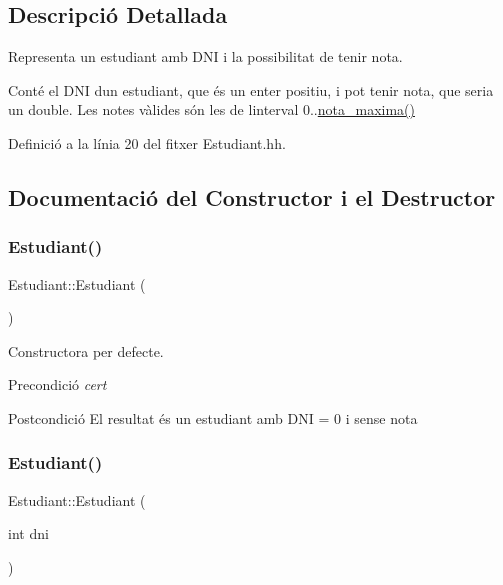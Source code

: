 \subsection{Descripció Detallada}
Representa un estudiant amb D\+NI i la possibilitat de tenir nota. 

Conté el D\+NI d\textquotesingle{}un estudiant, que és un enter positiu, i pot tenir nota, que seria un double. Les notes vàlides són les de l\textquotesingle{}interval 0..\hyperlink{class_estudiant_a5df5eed414c87a2a1c2efa4194633afd}{nota\+\_\+maxima()} 

Definició a la línia 20 del fitxer Estudiant.\+hh.



\subsection{Documentació del Constructor i el Destructor}
\mbox{\label{class_estudiant_a88f7f46dd946fef9f7a71fdc608afd16}} 
\subsubsection{\texorpdfstring{Estudiant()}{Estudiant()}\hspace{0.1cm}{\footnotesize\ttfamily [1/2]}}
{\footnotesize\ttfamily Estudiant\+::\+Estudiant (\begin{DoxyParamCaption}{ }\end{DoxyParamCaption})}



Constructora per defecte. 

\begin{DoxyPrecond}{Precondició}
{\itshape cert} 
\end{DoxyPrecond}
\begin{DoxyPostcond}{Postcondició}
El resultat és un estudiant amb D\+NI = 0 i sense nota 
\end{DoxyPostcond}
\mbox{\label{class_estudiant_ae0a9ebffe2ff8fb6cecc15a909206a1b}} 
\subsubsection{\texorpdfstring{Estudiant()}{Estudiant()}\hspace{0.1cm}{\footnotesize\ttfamily [2/2]}}
{\footnotesize\ttfamily Estudiant\+::\+Estudiant (\begin{DoxyParamCaption}\item[{int}]{dni }\end{DoxyParamCaption})}



